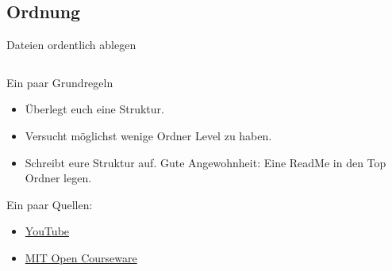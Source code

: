 
\subsection{Ordnung}
\begin{frame}[t]{Dateien ordentlich ablegen}
    \begin{columns}
        \begin{column}{0.5\textwidth}
            \vspace{-6cm}
            \begin{block}{Ein paar Grundregeln}
                \begin{itemize}
                    \item Überlegt euch eine Struktur.                 
                    \item Versucht möglichst wenige Ordner Level zu haben.
                    \item Schreibt eure Struktur auf. Gute Angewohnheit: Eine ReadMe in den Top Ordner legen.
            \end{itemize}  
            \end{block}
            {\small Ein paar Quellen:
            \begin{itemize}[]
                \item \href{https://www.youtube.com/watch?v=WtKeeDYA_2I&t=317s}{YouTube}
                \item \href{https://ocw.mit.edu/courses/res-str-002-data-management-spring-2016/497580bd31c004cc758a2afb0a115aa4_MITRES_STR_002S16_File.pdf}{MIT Open Courseware}
            \end{itemize}
            }


\end{column}
\end{columns}
\end{frame}
